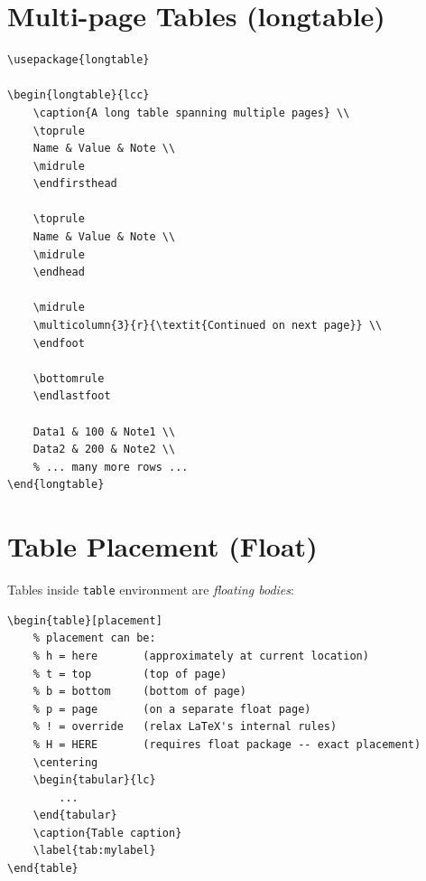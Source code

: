 \section{Multi-page Tables (longtable)}

\begin{lstlisting}[language={[LaTeX]TeX}, caption=longtable]
\usepackage{longtable}

\begin{longtable}{lcc}
    \caption{A long table spanning multiple pages} \\
    \toprule
    Name & Value & Note \\
    \midrule
    \endfirsthead

    \toprule
    Name & Value & Note \\
    \midrule
    \endhead

    \midrule
    \multicolumn{3}{r}{\textit{Continued on next page}} \\
    \endfoot

    \bottomrule
    \endlastfoot

    Data1 & 100 & Note1 \\
    Data2 & 200 & Note2 \\
    % ... many more rows ...
\end{longtable}
\end{lstlisting}

\section{Table Placement (Float)}

Tables inside \texttt{table} environment are \emph{floating bodies}:

\begin{lstlisting}[language={[LaTeX]TeX}, caption=Float placement specifiers]
\begin{table}[placement]
    % placement can be:
    % h = here       (approximately at current location)
    % t = top        (top of page)
    % b = bottom     (bottom of page)
    % p = page       (on a separate float page)
    % ! = override   (relax LaTeX's internal rules)
    % H = HERE       (requires float package -- exact placement)
    \centering
    \begin{tabular}{lc}
        ...
    \end{tabular}
    \caption{Table caption}
    \label{tab:mylabel}
\end{table}
\end{lstlisting}

